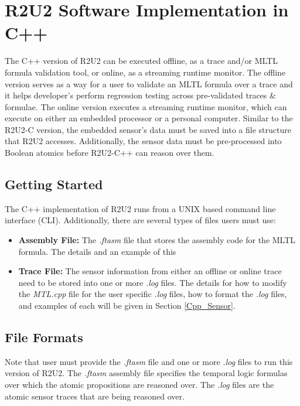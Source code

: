 \section{R2U2 Software Implementation in C++}
The C++ version of R2U2 can be executed offline, as a trace and/or MLTL formula validation tool, or online, as a streaming runtime monitor. The offline version serves as a way for a user to validate an MLTL formula over a trace and it helps developer's perform regression testing across pre-validated traces \& formulae. The online version executes a streaming runtime monitor, which can execute on either an embedded processor or a personal computer. Similar to the R2U2-C version, the embedded sensor's data must be saved into a file structure that R2U2 accesses. Additionally, the sensor data must be pre-processed into Boolean atomics before R2U2-C++ can reason over them.

\subsection{Getting Started}
The C++ implementation of R2U2 runs from a UNIX based command line interface (CLI). Additionally, there are several types of files users must use:
\begin{itemize}
	\item \textbf{Assembly File:} The \textit{.ftasm} file that stores the assembly code for the MLTL formula. The details and an example of this 
	\item \textbf{Trace File:} The sensor information from either an offline or online trace need to be stored into one or more \textit{.log} files. The details for how to modify the \textit{MTL.cpp} file for the user specific \textit{.log} files, how to format the \textit{.log} files, and examples of each will be given in Section \ref{Cpp_Sensor}.
	\end{itemize}
	

\subsection{File Formats}
Note that user must provide the \textit{.ftasm} file and one or more \textit{.log} files to run this version of R2U2. The \textit{.ftasm} assembly file specifies the temporal logic formulas over which the atomic propositions are reasoned over. The \textit{.log} files are the atomic sensor traces that are being reasoned over.

